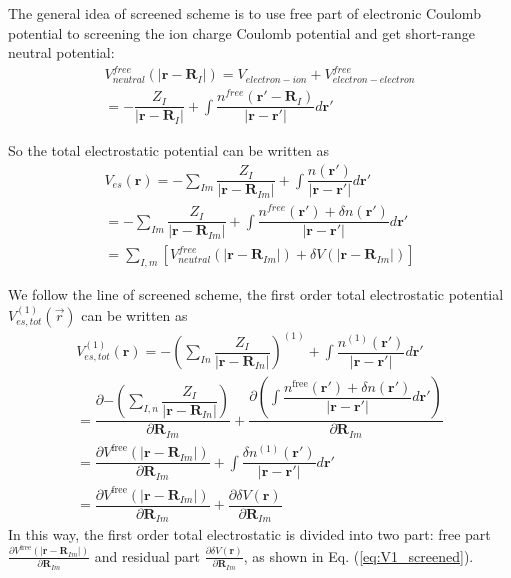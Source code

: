 {The general idea of screened scheme is to use free part of electronic Coulomb potential to screening the ion charge Coulomb potential and get short-range neutral potential: 
\begin{align}
V^{free}_{neutral}(|\mathbf{r-R}_I|)= V_{electron-ion} + V^{free}_{electron-electron} \\
=-\dfrac{Z_I}{|\mathbf{r-R}_I|}+\int{\dfrac{n^{free}(\mathbf{r'-R}_I)}{|\mathbf{r-r'}|}d \mathbf{r'}} \nonumber
\end{align}

So the total electrostatic potential can be written as\cite{Blum08}
\begin{align}
V_{es}(\mathbf{r})= -\sum_{Im}\dfrac{Z_{I}}{|\mathbf{r}-\mathbf{R}_{Im}|} +\int{\dfrac{n(\mathbf{r'})}{|\mathbf{r-r'}|}d\mathbf{r'}} \\
=-\sum_{Im}\dfrac{Z_{I}}{|\mathbf{r}-\mathbf{R}_{Im}|} +\int{\dfrac{n^{free}(\mathbf{r'}) + \delta n(\mathbf{r'})    }{|\mathbf{r-r'}|}d\mathbf{r'}} \nonumber \\
= \sum_{I,m}\left[ V^{free}_{neutral}(|\mathbf{r-R}_{I m}|) + \delta V(|\mathbf{r-R}_{I m}|) \right ] 
\end{align}


We follow the line of screened scheme, the first order total electrostatic potential~$V_{es,tot}^{(1)}(\vec{r})$ can be written as
\begin{align}
V_{es,tot}^{(1)}(\mathbf{r}) = -(\sum_{In}\dfrac{Z_{I}}{|\mathbf{r}-\mathbf{R}_{In}|})^{(1)}  +\int{\dfrac{n^{(1)}(\mathbf{r'})}{|\mathbf{r-r'}|}d\mathbf{r'}} \\
=\dfrac{\partial{-(\sum_{I,n}{\dfrac{Z_{I}}{|\mathbf{r}-\mathbf{R}_{In} |} })} }{\partial{\mathbf{R}_{Im}}}   +  \dfrac{\partial{(\int {\dfrac{n^{\text{free}}(\mathbf{r'}) + \delta n(\mathbf{r'})   }{|\mathbf{r}- \mathbf{r'}|}  d\mathbf{r'}})} }{ \partial{\mathbf{R}_{Im}}} \nonumber \\
= \dfrac{\partial V^{\text{free}}(|\mathbf{r-R}_{I m}|)}{\partial{\mathbf{R}_{I m}}}  +\int{\dfrac{\delta n^{(1)}(\mathbf{r'})}{|\mathbf{r-r'}|}d\mathbf{r'}} \nonumber \\
= \dfrac{\partial V^{\text{free}}(|\mathbf{r-R}_{I m}|)}{\partial{\mathbf{R}_{I m}}}  + \dfrac{\partial{ \delta V(\mathbf{r})} }{\partial \mathbf{R}_{Im} } \label{eq:V1_screened} 
\end{align}
In this way, the first order total electrostatic is
divided into two part: free part $\frac{\partial V^{\text{free}}(|\mathbf{r-R}_{I m}|)}{\partial{\mathbf{R}_{I m}}}$ and residual part $\frac{\partial{ \delta V(\mathbf{r})} }{\partial \mathbf{R}_{Im} }$, as shown in Eq. (\ref{eq:V1_screened}).


}
